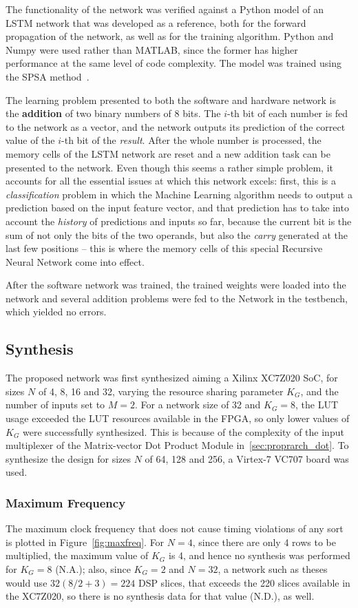 \documentclass{IEEEtran}
\begin{document}
The functionality of the network was verified against a Python model of an LSTM network that was developed as a reference,
both for the forward propagation of the network, as well as for the training algorithm. Python and Numpy were used rather than MATLAB,
since the former has higher performance at the same level of code complexity. The model was trained using the SPSA method~\cite{Spall98}.

The learning problem presented to both the software and hardware network is the \textbf{addition} of two binary numbers of 8 bits. The $i$-th
bit of each number is fed to the network as a vector, and the network outputs its prediction of the correct value of the $i$-th bit
of the \emph{result}. After the whole number is processed, the memory cells of the LSTM network are reset and a new addition
task can be presented to the network. Even though this seems a rather simple problem, it accounts for all the essential issues at which this
network excels: first, this is a \emph{classification} problem in which the Machine Learning algorithm needs to output a prediction based on
the input feature vector, and that prediction has to take into account the \emph{history} of predictions and inputs so far, because the current
bit is the sum of not only the bits of the two operands, but also the \emph{carry} generated at the last few positions -- this is where the
memory cells of this special Recursive Neural Network come into effect.

After the software network was trained, the trained weights were loaded into the network and several addition problems
were fed to the Network in the testbench, which yielded no errors.

\subsection{Synthesis}\label{sec:results_synth}
The proposed network was first synthesized aiming a Xilinx XC7Z020 SoC, for sizes $N$ of 4, 8, 16 and 32, varying the resource sharing parameter $K_G$, and the number of inputs set
to $M=2$. For a network size of 32 and $K_G=8$, the LUT usage exceeded the LUT resources available in the FPGA, so only lower values of $K_G$ were
successfully synthesized. This is because of the complexity of the input multiplexer of the Matrix-vector Dot Product Module in~\ref{sec:proprarch_dot}. To synthesize the
design for sizes $N$ of 64, 128 and 256, a Virtex-7 VC707 board was used.

\subsubsection{Maximum Frequency}\label{sec:results_synth_maxfreq}
The maximum clock frequency that does not cause timing violations of any sort is plotted in Figure~\ref{fig:maxfreq}. For $N=4$, since there are
only 4 rows to be multiplied, the maximum value of $K_G$ is 4, and hence no synthesis was performed for $K_G = 8$ (N.A.); also,
since $K_G = 2$ and $N=32$, a network such as theses would use $32(8/2+3) = 224$ DSP slices, that exceeds the 220 slices
available in the XC7Z020, so there is no synthesis data for that value (N.D.), as well.
\end{document}
